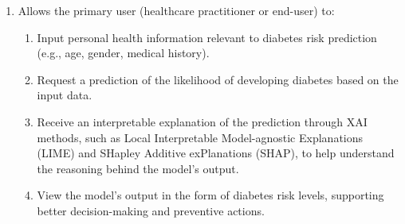 \documentclass[11pt,a4paper,titlepage]{article}
\begin{document}
\begin{enumerate}
    \item Allows the primary user (healthcare practitioner or end-user) to:
    \begin{enumerate}
        \item Input personal health information relevant to diabetes risk prediction (e.g., age, gender, medical history).
        \item Request a prediction of the likelihood of developing diabetes based on the input data.
        \item Receive an interpretable explanation of the prediction through XAI methods, such as Local Interpretable Model-agnostic Explanations (LIME) and SHapley Additive exPlanations (SHAP), to help understand the reasoning behind the model’s output.
        \item View the model’s output in the form of diabetes risk levels, supporting better decision-making and preventive actions.
    \end{enumerate}
    

\end{enumerate}
\end{document}
